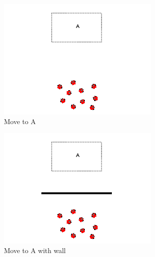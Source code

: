 \documentclass[]{article}
\begin{document}
\begin{figure}
	\centering
	\begin{subfigure}{0.42\textwidth}
		\centering
		\includegraphics[width=\linewidth]{slide_images/Swarm_Robot_Control_-_10_Robot_0003.png}
		\caption{Move to A}
		\label{fig:sub1}
	\end{subfigure}%
	\begin{subfigure}{0.42\textwidth}
		\centering
		\includegraphics[width=\linewidth]{slide_images/Swarm_Robot_Control_-_10_Robot_0005.png}
		\caption{Move to A with wall}
		\label{fig:sub2}
	\end{subfigure}
	\begin{subfigure}{0.42\textwidth}
		\centering

\end{subfigure}
\end{figure}
\end{document}
